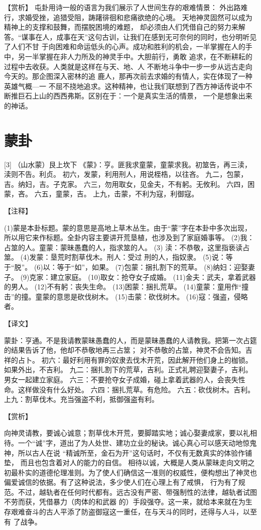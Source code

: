 \documentclass[12pt,UTF8]{ctexbook}
\begin{document}
【赏析】
屯卦用诗一般的语言为我们展示了人世间生存的艰难情景： 外出路难行，求婚受挫，追猎受阻，踌躇徘徊和悲痛欲绝的心境。 天地神灵固然可以成为精神上的支撑和鼓舞，而摆脱困境的难题， 却必须由人们凭借自己的努力来解答。“谋事在人，成事在天”这句古训，让我们在感到无可奈何的同时，也分明听见了人们不甘 于向困难和命运低头的心声。成功和胜利的机会，一半掌握在人的手中，另一半掌握在非人力所及的神灵手中。大胆前行，勇敢 追求，在不断耕耘的过程中去收获。人类就是这样在与天、地、人 不断地斗争中一步一步从远古走向今天的。那企图深入密林的追 鹿人，那再次前去求婚的有情人，实在体现了一种英雄气概—一 不屈不挠地追求。这种精神，也让我们联想到了西方神话传说中不断推巨石上山的西西弗斯。区别在于：一个是真实生活的情景， 一个是想象出来的神话。 

\chapter{蒙卦}
[3]
（山水蒙）艮上坎下
《蒙》：亨。匪我求童蒙，童蒙求我。初筮告，再三渎，渎则不告。利贞。
初六，发蒙，利用刑人，用说桎梏，以往吝。
九二，包蒙，吉。纳妇，吉。子克家。
六三，勿用取女，见金夫，不有躬。无攸利。
六四，困蒙，吝。
六五，童蒙，吉。
上九，击蒙，不利为寇，利御寇。

【注释】

(1)蒙是本卦标题。蒙的意思是高地上草木丛生。由于“蒙”字在本卦中多次出现，所以用它来作标题。全卦内容主要讲开荒垦植，也涉及到了家庭婚事等。
(2)我：占筮的人。童蒙：蒙昧愚蠢的人，指求筮的人。
(3) 渎：不恭敬，这里指亵读占筮。
(4)发蒙：垦荒时割草伐木。刑人：受过 刑的人，指奴隶。
(5)说：等于“脱”。
(6)以：等于“如”，如果。
(7)包蒙：捆扎割下的荒草。
(8)纳妇：迎娶妻子。
(9)克家：建立家庭。
(10)取女：抢夺女子成婚。
(11)金夫：武夫，拿着武器的男人。
(12)不有躬：丧失生命。
(13)困蒙：捆扎荒草。
(14)童蒙：童用作“撞击”的撞。童蒙的意思是砍伐树木。
(15)击蒙：砍伐树木。
(16)寇：强盗，侵略者。

【译文】

蒙卦：亨通。不是我请教蒙昧愚蠢的人，而是蒙昧愚蠢的人请教我。把第一次占筵的结果告诉了他，他却不恭敬地再三占筮； 对不恭敬的占筮，神灵不会告知。吉祥的占卜。
初六：最好利用有罪的奴隶去伐木开荒，因此解开他们身上的枷锁。如果外出，不吉利。
九二：捆扎割下的荒草，吉利。正式礼聘迎娶妻子，吉利。男女一起建立家庭。
六三：不要抢夺女子成婚，碰上拿着武器的人，会丧失性命。这样做没有什么好处。
六四：捆扎荒草。有危险。
六五：砍伐树木。吉利。
上九：割草伐木。充当强盗不利，抵御强盗有利。

【赏析】

向神灵请教，要诚心诚意；割草伐木开荒，要脚踏实地；诚心娶妻成家，要以礼相待。一个“诚”字，道出了为人处世、建功立业的秘诀。诚心真心可以感天动地惊鬼神，所以古人在说 “精诚所至，金石为开”这句话时，不仅有无数真实的体验作铺垫， 而且也包含着对人的能力的自信。 相待以诚，大概是人类从蒙昧走向文明之初最朴实的道德伦理准则。为了使人们确信这一准则的权威性，便构想出了神灵也 偏爱诚信的依据。有了这种说法，多少使人们在心理上有了戒惧， 行为有了规范。不过，越轨者在任何时代都有。远古没有严密、带强制性的法律，越轨者试图不劳而获，凭借暴力（肉体的和武器 的）手段强夺。这一来，就给本来就在为生存艰难奋斗的古人平添了防盗御寇这一重任，在与天斗的同时，还得与人斗，以至有 了战争。
\end{document}
